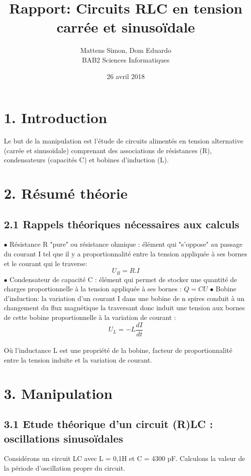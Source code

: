 \documentclass{report}
\title{Rapport: Circuits RLC en tension carrée et sinusoïdale}
\author{Mattens Simon, Dom Eduardo \\ BAB2 Sciences Informatiques}
\date{26 avril 2018}
\begin{document}
\maketitle

\section*{1. Introduction}

\hspace*{0,5cm} Le  but  de  la  manipulation  est  l'étude  de  circuits  alimentés  en  tension  alternative 
(carrée  et 
sinusoïdale) 
comprenant 
des  associations  de  résistances  (R),  condensateurs  (capacités  C)  et 
bobines d'induction (L).

\section*{2. R\'esum\'e th\'eorie}
\subsection*{2.1 Rappels th\'eoriques n\'ecessaires aux calculs}
$\bullet$ Résistance  R "pure"  ou  résistance    ohmique  : élément  qui  "s'oppose"  au  passage  du courant  I tel que il y a proportionnalité entre la tension appliquée à ses bornes et le courant qui le traverse:     
$$ U_{R} = R.I$$
$\bullet$ Condensateur de capacité C : élément qui permet de stocker une quantité de charges proportionnelle à la tension appliquée à ses bornes : $ Q = CU  $
$\bullet$ Bobine  d'induction:  la  variation  d'un  courant  I  dans  une bobine  de  n  spires  conduit  à  un changement  du  flux  magnétique  la traversant donc induit  une  tension  aux bornes de cette bobine proportionnelle à la variation de courant : $$U_{L} = -L\frac{dI}{dt} $$
\\ Où l'inductance  L est  une  propriété  de  la  bobine,  facteur  de proportionnalité  entre  la  tension induite  et  la  variation  de  courant.

\section*{3. Manipulation}
\subsection*{3.1 Etude théorique d'un circuit (R)LC : oscillations sinusoïdales}
Considérons un circuit  LC  avec  L  =  0,1H  et  C  =  4300 pF.
Calculons la valeur de la période d’oscillation propre du circuit. \\
\end{document}
